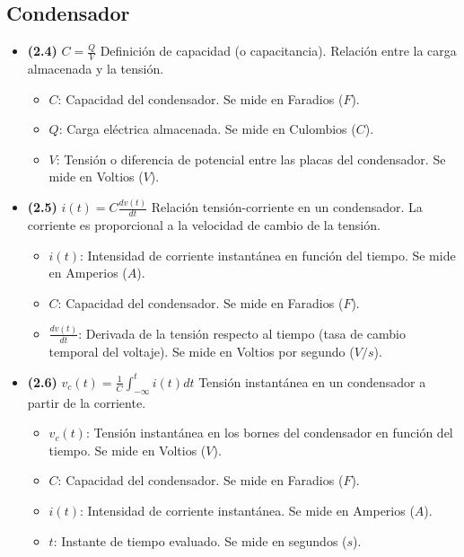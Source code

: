 \documentclass{article}
\begin{document}
		\subsection*{Condensador}
			\begin{itemize}
				\item \textbf{(2.4)} $\boxed{C=\frac{Q}{V}}$ Definición de capacidad (o capacitancia). Relación entre la carga almacenada y la tensión.
					\begin{itemize}
						\item $C$: Capacidad del condensador. Se mide en Faradios ($F$).
						\item $Q$: Carga eléctrica almacenada. Se mide en Culombios ($C$).
						\item $V$: Tensión o diferencia de potencial entre las placas del condensador. Se mide en Voltios ($V$).
					\end{itemize}

				\item \textbf{(2.5)} $\boxed{i(t)=C\frac{dv(t)}{dt}}$ Relación tensión-corriente en un condensador. La corriente es proporcional a la velocidad de cambio de la tensión.
					\begin{itemize}
						\item $i(t)$: Intensidad de corriente instantánea en función del tiempo. Se mide en Amperios ($A$).
						\item $C$: Capacidad del condensador. Se mide en Faradios ($F$).
						\item $\frac{dv(t)}{dt}$: Derivada de la tensión respecto al tiempo (tasa de cambio temporal del voltaje). Se mide en Voltios por segundo ($V/s$).
					\end{itemize}

				\item \textbf{(2.6)} $\boxed{v_c(t)=\frac{1}{C}\int_{-\infty}^{t} i(t)dt}$ Tensión instantánea en un condensador a partir de la corriente.
					\begin{itemize}
						\item $v_c(t)$: Tensión instantánea en los bornes del condensador en función del tiempo. Se mide en Voltios ($V$).
						\item $C$: Capacidad del condensador. Se mide en Faradios ($F$).
						\item $i(t)$: Intensidad de corriente instantánea. Se mide en Amperios ($A$).
						\item $t$: Instante de tiempo evaluado. Se mide en segundos ($s$).
					\end{itemize}


\end{itemize}
\end{document}
